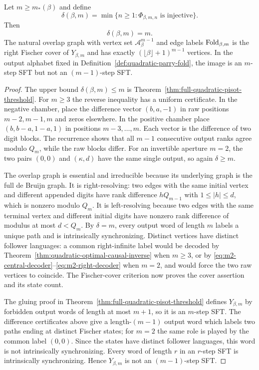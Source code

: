 \begin{theorem}
\label{thm:quadratic-exact-local-order}
Let $m\ge m_*(\beta)$ and define
\[
\delta(\beta,m)=\min\{n\ge1:\Phi_{\beta,m,n}\text{ is injective}\}.
\]
Then
\[
\delta(\beta,m)=m.
\]
The natural overlap graph with vertex set
$\mathcal A_\beta^{m-1}$ and edge labels $\mathrm{Fold}_{\beta,m}$ is the right
Fischer cover of $Y_{\beta,m}$ and has exactly
$(\lfloor\beta\rfloor+1)^{m-1}$ vertices.  In the output alphabet fixed in
Definition~\ref{def:quadratic-parry-fold}, the image is an $m$-step SFT but
not an $(m-1)$-step SFT.
\end{theorem}

\begin{proof}
The upper bound $\delta(\beta,m)\le m$ is
Theorem~\ref{thm:full-quadratic-pisot-threshold}.  For $m\ge3$ the reverse
inequality has a uniform certificate.  In the negative chamber, place the
difference vector $(b,a,-1)$ in raw positions $m-2,m-1,m$ and zeros
elsewhere.  In the positive chamber place
$(b,b-a,1-a,1)$ in positions $m-3,\ldots,m$.  Each vector is the difference
of two digit blocks.  The recurrence shows that all $m-1$ consecutive output
ranks agree modulo $Q_m$, while the raw blocks differ.  For an invertible
aperture $m=2$, the two pairs $(0,0)$ and $(\kappa,d)$ have the same single
output, so again $\delta\ge m$.

The overlap graph is essential and irreducible because its underlying graph
is the full de Bruijn graph.  It is right-resolving: two edges with the same
initial vertex and different appended digits have rank difference
$hQ_{m-1}$ with $1\le|h|\le d$, which is nonzero modulo $Q_m$.  It is
left-resolving because two edges with the same terminal vertex and different
initial digits have nonzero rank difference of modulus at most $d<Q_m$.
By $\delta=m$, every output word of length $m$ labels a unique path and is
intrinsically synchronizing.  Distinct vertices have distinct follower
languages: a common right-infinite label would be decoded by
Theorem~\ref{thm:quadratic-optimal-causal-inverse} when $m\ge3$, or by
\eqref{eq:m2-central-decoder}--\eqref{eq:m2-right-decoder} when $m=2$, and
would force the two raw vertices to coincide.  The Fischer-cover criterion
now proves the cover assertion and its state count.

The gluing proof in Theorem~\ref{thm:full-quadratic-pisot-threshold} defines
$Y_{\beta,m}$ by forbidden output words of length at most $m+1$, so it is an
$m$-step SFT.  The difference certificates above give a length-$(m-1)$
output word which labels two paths ending at distinct Fischer states; for
$m=2$ the same role is played by the common label $(0,0)$.  Since the states
have distinct follower languages, this word is not intrinsically
synchronizing.  Every word of length $r$ in an $r$-step SFT is intrinsically
synchronizing.  Hence $Y_{\beta,m}$ is not an $(m-1)$-step SFT.
\end{proof}

